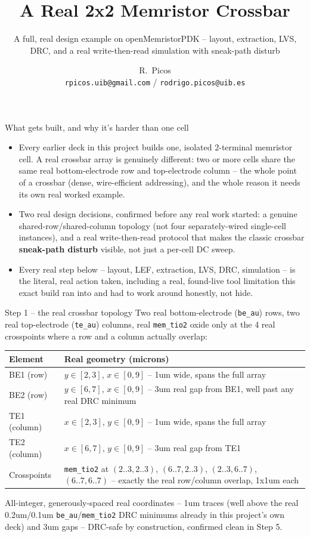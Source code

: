 \documentclass[aspectratio=169,9pt]{beamer}
\title{A Real 2x2 Memristor Crossbar}
\subtitle{A full, real design example on openMemristorPDK -- layout, extraction, LVS, DRC, and a real write-then-read simulation with sneak-path disturb}
\author{R.~Picos\\{\small\texttt{rpicos.uib@gmail.com} / \texttt{rodrigo.picos@uib.es}}}
\institute{Project PID2025-170062NB (MemFRAME) funded by\\MICIU/AEI/10.13039/501100011033}
\date{}
\begin{document}
\frame{\titlepage}

\begin{frame}{What gets built, and why it's harder than one cell}
\footnotesize
\begin{itemize}
  \item Every earlier deck in this project builds one, isolated
        2-terminal memristor cell. A real crossbar array is
        genuinely different: two or more cells share the same real
        bottom-electrode row and top-electrode column -- the whole
        point of a crossbar (dense, wire-efficient addressing), and
        the whole reason it needs its own real worked example.
  \item Two real design decisions, confirmed before any real work
        started: a genuine shared-row/shared-column topology (not
        four separately-wired single-cell instances), and a real
        write-then-read protocol that makes the classic crossbar
        \textbf{sneak-path disturb} visible, not just a per-cell DC
        sweep.
  \item Every real step below -- layout, LEF, extraction, LVS, DRC,
        simulation -- is the literal, real action taken, including a
        real, found-live tool limitation this exact build ran into
        and had to work around honestly, not hide.
\end{itemize}
\end{frame}

\begin{frame}[fragile]{Step 1 -- the real crossbar topology}
Two real bottom-electrode (\texttt{be\_au}) rows, two real
top-electrode (\texttt{te\_au}) columns, real \texttt{mem\_tio2}
oxide only at the 4 real crosspoints where a row and a column
actually overlap:
\begin{center}
\begin{tabularx}{\textwidth}{lX}
\toprule
Element & Real geometry (microns) \\
\midrule
BE1 (row) & $y \in [2,3]$, $x \in [0,9]$ -- 1um wide, spans the full array \\
BE2 (row) & $y \in [6,7]$, $x \in [0,9]$ -- 3um real gap from BE1, well past any real DRC minimum \\
TE1 (column) & $x \in [2,3]$, $y \in [0,9]$ -- 1um wide, spans the full array \\
TE2 (column) & $x \in [6,7]$, $y \in [0,9]$ -- 3um real gap from TE1 \\
Crosspoints & \texttt{mem\_tio2} at $(2..3,2..3)$, $(6..7,2..3)$, $(2..3,6..7)$, $(6..7,6..7)$ -- exactly the real row/column overlap, 1x1um each \\
\bottomrule
\end{tabularx}
\end{center}
All-integer, generously-spaced real coordinates -- 1um traces (well
above the real 0.2um/0.1um \texttt{be\_au}/\texttt{mem\_tio2} DRC
minimums already in this project's own deck) and 3um gaps -- DRC-safe
by construction, confirmed clean in Step 5.
\end{frame}
\end{document}
